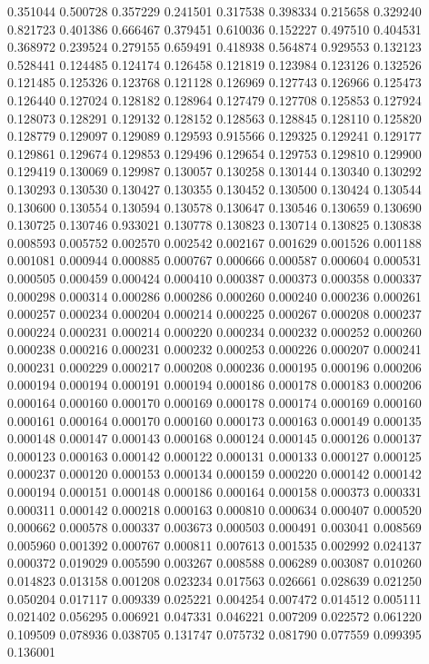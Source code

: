 0.351044
0.500728
0.357229
0.241501
0.317538
0.398334
0.215658
0.329240
0.821723
0.401386
0.666467
0.379451
0.610036
0.152227
0.497510
0.404531
0.368972
0.239524
0.279155
0.659491
0.418938
0.564874
0.929553
0.132123
0.528441
0.124485
0.124174
0.126458
0.121819
0.123984
0.123126
0.132526
0.121485
0.125326
0.123768
0.121128
0.126969
0.127743
0.126966
0.125473
0.126440
0.127024
0.128182
0.128964
0.127479
0.127708
0.125853
0.127924
0.128073
0.128291
0.129132
0.128152
0.128563
0.128845
0.128110
0.125820
0.128779
0.129097
0.129089
0.129593
0.915566
0.129325
0.129241
0.129177
0.129861
0.129674
0.129853
0.129496
0.129654
0.129753
0.129810
0.129900
0.129419
0.130069
0.129987
0.130057
0.130258
0.130144
0.130340
0.130292
0.130293
0.130530
0.130427
0.130355
0.130452
0.130500
0.130424
0.130544
0.130600
0.130554
0.130594
0.130578
0.130647
0.130546
0.130659
0.130690
0.130725
0.130746
0.933021
0.130778
0.130823
0.130714
0.130825
0.130838
0.008593
0.005752
0.002570
0.002542
0.002167
0.001629
0.001526
0.001188
0.001081
0.000944
0.000885
0.000767
0.000666
0.000587
0.000604
0.000531
0.000505
0.000459
0.000424
0.000410
0.000387
0.000373
0.000358
0.000337
0.000298
0.000314
0.000286
0.000286
0.000260
0.000240
0.000236
0.000261
0.000257
0.000234
0.000204
0.000214
0.000225
0.000267
0.000208
0.000237
0.000224
0.000231
0.000214
0.000220
0.000234
0.000232
0.000252
0.000260
0.000238
0.000216
0.000231
0.000232
0.000253
0.000226
0.000207
0.000241
0.000231
0.000229
0.000217
0.000208
0.000236
0.000195
0.000196
0.000206
0.000194
0.000194
0.000191
0.000194
0.000186
0.000178
0.000183
0.000206
0.000164
0.000160
0.000170
0.000169
0.000178
0.000174
0.000169
0.000160
0.000161
0.000164
0.000170
0.000160
0.000173
0.000163
0.000149
0.000135
0.000148
0.000147
0.000143
0.000168
0.000124
0.000145
0.000126
0.000137
0.000123
0.000163
0.000142
0.000122
0.000131
0.000133
0.000127
0.000125
0.000237
0.000120
0.000153
0.000134
0.000159
0.000220
0.000142
0.000142
0.000194
0.000151
0.000148
0.000186
0.000164
0.000158
0.000373
0.000331
0.000311
0.000142
0.000218
0.000163
0.000810
0.000634
0.000407
0.000520
0.000662
0.000578
0.000337
0.003673
0.000503
0.000491
0.003041
0.008569
0.005960
0.001392
0.000767
0.000811
0.007613
0.001535
0.002992
0.024137
0.000372
0.019029
0.005590
0.003267
0.008588
0.006289
0.003087
0.010260
0.014823
0.013158
0.001208
0.023234
0.017563
0.026661
0.028639
0.021250
0.050204
0.017117
0.009339
0.025221
0.004254
0.007472
0.014512
0.005111
0.021402
0.056295
0.006921
0.047331
0.046221
0.007209
0.022572
0.061220
0.109509
0.078936
0.038705
0.131747
0.075732
0.081790
0.077559
0.099395
0.136001

